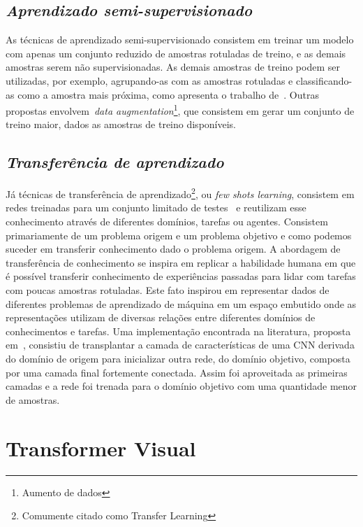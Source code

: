 \subsection{\textit{Aprendizado semi-supervisionado}}\label{sec:Cap2_semisup}

As técnicas de aprendizado semi-supervisionado consistem em treinar um modelo com apenas um conjunto reduzido de amostras rotuladas de treino, e as demais amostras serem não supervisionadas. As demais amostras de treino podem ser utilizadas, por exemplo, agrupando-as com as amostras rotuladas e classificando-as como a amostra mais próxima, como apresenta o trabalho de~\cite{Sanches2003}. Outras propostas envolvem~\textit{data augmentation}\footnote{Aumento de dados}, que consistem em gerar um conjunto de treino maior, dados as amostras de treino disponíveis.

\subsection{\textit{Transferência de aprendizado}}\label{sec:Cap2_transfer}

Já técnicas de transferência de aprendizado\footnote{Comumente citado como Transfer Learning}, ou \textit{few shots learning}, consistem em redes treinadas para um conjunto limitado de testes~\cite{rostami2019learning}
e reutilizam esse conhecimento através de diferentes domínios, tarefas ou agentes. Consistem primariamente de um problema origem e um problema objetivo e como podemos suceder em transferir conhecimento dado o problema origem. A abordagem de transferência de conhecimento se inspira em replicar a habilidade humana em que é possível transferir conhecimento de experiências passadas para lidar com tarefas com poucas amostras rotuladas. Este fato inspirou em representar dados de diferentes problemas de aprendizado de máquina em um espaço embutido onde as representações utilizam de diversas relações entre diferentes domínios de conhecimentos e tarefas. Uma implementação encontrada na literatura, proposta em~\cite{rostami2019learning}, consistiu de transplantar a camada de características de uma CNN derivada do domínio de origem para inicializar outra rede, do domínio objetivo, composta por uma camada final fortemente conectada. Assim foi aproveitada as primeiras camadas e a rede foi trenada para o domínio objetivo com uma quantidade menor de amostras.


\section{Transformer Visual}\label{sec:Cap2_transformer_visual}


